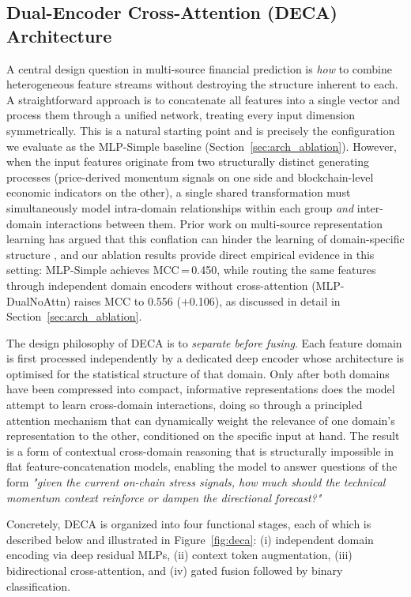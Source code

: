 \documentclass[final,3p,times,authoryear]{elsarticle}
\begin{document}
\subsection{Dual-Encoder Cross-Attention (DECA) Architecture}
\label{sec:deca}

A central design question in multi-source financial prediction is
\emph{how} to combine heterogeneous feature streams without destroying
the structure inherent to each.
A straightforward approach is to concatenate all features into a single
vector and process them through a unified network, treating every input
dimension symmetrically.
This is a natural starting point and is precisely the configuration we
evaluate as the MLP-Simple baseline (Section~\ref{sec:arch_ablation}).
However, when the input features originate from two structurally
distinct generating processes (price-derived momentum signals on one
side and blockchain-level economic indicators on the other), a single
shared transformation must simultaneously model intra-domain
relationships within each group \emph{and} inter-domain interactions
between them.
Prior work on multi-source representation learning has argued that this
conflation can hinder the learning of domain-specific structure
\citep{ngiam2011multimodal}, and our ablation results provide direct
empirical evidence in this setting: MLP-Simple achieves MCC\,=\,0.450,
while routing the same features through independent domain encoders
without cross-attention (MLP-DualNoAttn) raises MCC to 0.556
($+$0.106), as discussed in detail in
Section~\ref{sec:arch_ablation}.

The design philosophy of DECA is to \emph{separate before fusing}.
Each feature domain is first processed independently by a dedicated
deep encoder whose architecture is optimised for the statistical
structure of that domain.
Only after both domains have been compressed into compact, informative
representations does the model attempt to learn cross-domain
interactions, doing so through a principled attention
mechanism that can dynamically weight the relevance of one domain's
representation to the other, conditioned on the specific input at hand.
The result is a form of contextual cross-domain reasoning that is
structurally impossible in flat feature-concatenation models, enabling
the model to answer questions of the form
\emph{"given the current on-chain stress signals, how much should the
technical momentum context reinforce or dampen the directional forecast?"}

Concretely, DECA is organized into four functional stages, each of
which is described below and illustrated in Figure~\ref{fig:deca}:
(i) independent domain encoding via deep residual MLPs,
(ii) context token augmentation,
(iii) bidirectional cross-attention, and
(iv) gated fusion followed by binary classification.
\end{document}
